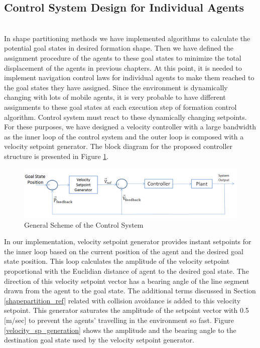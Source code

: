 \subsection{Control System Design for Individual Agents}\hspace{0pt}\label{lqr_design}  \\ 
In shape partitioning methods we have implemented algorithms to calculate the potential goal states in desired formation shape. Then we have defined the assignment procedure of the agents to these goal states to minimize the total displacement of the agents in previous chapters. At this point, it is needed to implement navigation control laws for individual agents to make them reached to the goal states they have assigned. Since the environment is dynamically changing with lots of  mobile agents, it is very probable to have different assignments to these goal states at each execution step of formation control algorithm. Control system must react to these dynamically changing setpoints. For these purposes, we have designed a velocity controller with a large bandwidth as the inner loop of the control system and the outer loop is composed with a velocity setpoint generator. The block diagram for the proposed controller structure is presented in Figure \ref{Controller_ref}.

\begin{figure}[H]
\caption{General Scheme of the Control System} \label{Controller_ref}
\centering
\includegraphics[scale = 0.45]{controller}
\end{figure}

In our implementation, velocity setpoint generator provides instant setpoints for the inner loop based on the current position of the agent and the desired goal state position.  This loop calculates the amplitude of the velocity setpoint proportional with the Euclidian distance of agent to the desired goal state. The direction of this velocity setpoint vector has a bearing angle of the line segment drawn from the agent to the goal state. The additional terms discussed in Section \ref{shapepartition_ref} related with collision avoidance is added to this velocity setpoint. This generator saturates the amplitude of the setpoint vector with 0.5 [m/sec] to prevent the agents' travelling in the environment so fast. Figure \ref{velocity_sp_generation} shows the amplitude and the bearing angle to the destination goal state used by the velocity setpoint generator.

